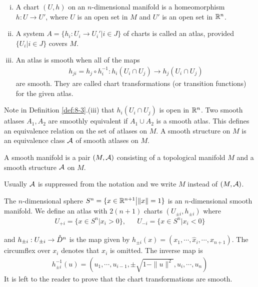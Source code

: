 \begin{definition}\label{def:8-3}\;\par 
  \begin{enumerate}[(i)]
    \item A chart $(U, h)$ on an $n$-dimensional manifold is a homeomorphism 
      $h:U\to U'$, where $U$ is an open set in $M$ and $U'$ is an open set in $\mathbb{R}^n$.
    \item A system $A = \{h_i: U_i\to U_i'\big| i\in J\}$ of charts is called an atlas, provided 
      $\{U_i \big| i\in J\}$ covers $M$.
    \item An atlas is smooth when all of the maps 
      \begin{align*}
        h_{ji} = h_j\circ h_i^{-1}:h_i(U_i\cap U_j) \to h_j(U_i\cap U_j)
      \end{align*}
      are smooth. They are called chart transformations (or transition functions) for the given atlas.
  \end{enumerate}
\end{definition}

Note in Definition \ref{def:8-3}.(iii) that $h_i(U_i\cap U_j)$ is open in $\mathbb{R}^n$.
Two smooth atlases $A_1, A_2$ are smoothly equivalent if $A_1\cup A_2$ is a smooth atlas.
This defines an equivalence relation on the set of atlases on $M$. A smooth structure
on $M$ is an equivalence class $\mathcal{A}$ of smooth atlases on $M$.

\begin{definition}\label{def:8-4}
  A smooth manifold is a pair $(M, \mathcal{A})$ consisting of a topological
manifold $M$ and a smooth structure $\mathcal{A}$ on $M$.
\end{definition}

Usually $\mathcal{A}$ is suppressed from the notation and we write $M$ instead of $(M, \mathcal{A})$. 

\begin{example}\label{example:8-5}
  The $n$-dimensional sphere $S^n = \{x\in\mathbb{R}^{n+1}\big| \|x\|=1\}$ is an $n$-dimensional smooth 
  manifold. We define an atlas with $2(n+1)$ charts $(U_{\pm i}, h_{\pm i})$ where 
  \begin{align*}
    U_{+i} = \{x\in S^n\big| x_i>0\},
    && U_{-i} = \{x\in S^n\big| x_i<0\}
  \end{align*}

  and $h_{\pm i}:U_{\pm i}\to \mathring{D}^n$ is the map given by $h_{\pm i}(x) = (x_1, \cdots, \hat{x}_i, \cdots, x_{n+1})$. 
  The circumflex over $x_i$ denotes that $x_i$ is omitted. The inverse map is 
  \begin{align*}
    h_{\pm i}^{-1}(u) = \left(u_1, \cdots, u_{i-1}, \pm\sqrt{1-\|u\|^2}, u_i, \cdots, u_n\right)
  \end{align*}
  It is left to the reader to prove that the chart transformations are smooth.
\end{example}

